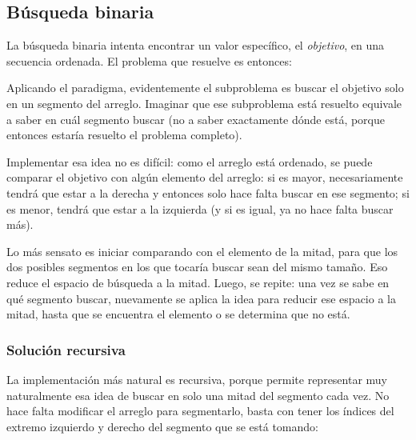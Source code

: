 \subsection{Búsqueda binaria}

La búsqueda binaria intenta encontrar un valor específico, el \emph{objetivo}, en una secuencia ordenada. El problema que resuelve es entonces:
\begin{especificacion}
\end{especificacion}

Aplicando el paradigma, evidentemente el subproblema es buscar el objetivo solo en un segmento del arreglo. Imaginar que ese subproblema está resuelto equivale a saber en cuál segmento buscar (no a saber exactamente dónde está, porque entonces estaría resuelto el problema completo).

Implementar esa idea no es difícil: como el arreglo está ordenado, se puede comparar el objetivo con algún elemento del arreglo: si es mayor, necesariamente tendrá que estar a la derecha y entonces solo hace falta buscar en ese segmento; si es menor, tendrá que estar a la izquierda (y si es igual, ya no hace falta buscar más).

Lo más sensato es iniciar comparando con el elemento de la mitad, para que los dos posibles segmentos en los que tocaría buscar sean del mismo tamaño. Eso reduce el espacio de búsqueda a la mitad. Luego, se repite: una vez se sabe en qué segmento buscar, nuevamente se aplica la idea para reducir ese espacio a la mitad, hasta que se encuentra el elemento o se determina que no está.

\subsubsection{Solución recursiva}
\label{sec:busqueda_binaria_recursiva}

La implementación más natural es recursiva, porque permite representar muy naturalmente esa idea de buscar en solo una mitad del segmento cada vez. No hace falta modificar el arreglo para segmentarlo, basta con tener los índices del extremo izquierdo y derecho del segmento que se está tomando:

